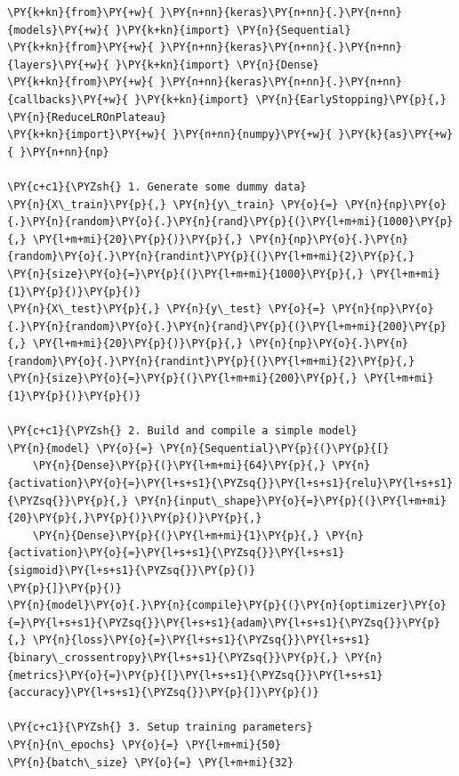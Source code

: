 \begin{Verbatim}[fontsize=\footnotesize, label=\makebox{\url{https://github.com/lucabaldini/cmepda/tree/master/slides/latex/snippets/keras_callbacks_training.py}},commandchars=\\\{\}]
\PY{k+kn}{from}\PY{+w}{ }\PY{n+nn}{keras}\PY{n+nn}{.}\PY{n+nn}{models}\PY{+w}{ }\PY{k+kn}{import} \PY{n}{Sequential}
\PY{k+kn}{from}\PY{+w}{ }\PY{n+nn}{keras}\PY{n+nn}{.}\PY{n+nn}{layers}\PY{+w}{ }\PY{k+kn}{import} \PY{n}{Dense}
\PY{k+kn}{from}\PY{+w}{ }\PY{n+nn}{keras}\PY{n+nn}{.}\PY{n+nn}{callbacks}\PY{+w}{ }\PY{k+kn}{import} \PY{n}{EarlyStopping}\PY{p}{,} \PY{n}{ReduceLROnPlateau}
\PY{k+kn}{import}\PY{+w}{ }\PY{n+nn}{numpy}\PY{+w}{ }\PY{k}{as}\PY{+w}{ }\PY{n+nn}{np}

\PY{c+c1}{\PYZsh{} 1. Generate some dummy data}
\PY{n}{X\_train}\PY{p}{,} \PY{n}{y\_train} \PY{o}{=} \PY{n}{np}\PY{o}{.}\PY{n}{random}\PY{o}{.}\PY{n}{rand}\PY{p}{(}\PY{l+m+mi}{1000}\PY{p}{,} \PY{l+m+mi}{20}\PY{p}{)}\PY{p}{,} \PY{n}{np}\PY{o}{.}\PY{n}{random}\PY{o}{.}\PY{n}{randint}\PY{p}{(}\PY{l+m+mi}{2}\PY{p}{,} \PY{n}{size}\PY{o}{=}\PY{p}{(}\PY{l+m+mi}{1000}\PY{p}{,} \PY{l+m+mi}{1}\PY{p}{)}\PY{p}{)}
\PY{n}{X\_test}\PY{p}{,} \PY{n}{y\_test} \PY{o}{=} \PY{n}{np}\PY{o}{.}\PY{n}{random}\PY{o}{.}\PY{n}{rand}\PY{p}{(}\PY{l+m+mi}{200}\PY{p}{,} \PY{l+m+mi}{20}\PY{p}{)}\PY{p}{,} \PY{n}{np}\PY{o}{.}\PY{n}{random}\PY{o}{.}\PY{n}{randint}\PY{p}{(}\PY{l+m+mi}{2}\PY{p}{,} \PY{n}{size}\PY{o}{=}\PY{p}{(}\PY{l+m+mi}{200}\PY{p}{,} \PY{l+m+mi}{1}\PY{p}{)}\PY{p}{)}

\PY{c+c1}{\PYZsh{} 2. Build and compile a simple model}
\PY{n}{model} \PY{o}{=} \PY{n}{Sequential}\PY{p}{(}\PY{p}{[}
    \PY{n}{Dense}\PY{p}{(}\PY{l+m+mi}{64}\PY{p}{,} \PY{n}{activation}\PY{o}{=}\PY{l+s+s1}{\PYZsq{}}\PY{l+s+s1}{relu}\PY{l+s+s1}{\PYZsq{}}\PY{p}{,} \PY{n}{input\_shape}\PY{o}{=}\PY{p}{(}\PY{l+m+mi}{20}\PY{p}{,}\PY{p}{)}\PY{p}{)}\PY{p}{,}
    \PY{n}{Dense}\PY{p}{(}\PY{l+m+mi}{1}\PY{p}{,} \PY{n}{activation}\PY{o}{=}\PY{l+s+s1}{\PYZsq{}}\PY{l+s+s1}{sigmoid}\PY{l+s+s1}{\PYZsq{}}\PY{p}{)}
\PY{p}{]}\PY{p}{)}
\PY{n}{model}\PY{o}{.}\PY{n}{compile}\PY{p}{(}\PY{n}{optimizer}\PY{o}{=}\PY{l+s+s1}{\PYZsq{}}\PY{l+s+s1}{adam}\PY{l+s+s1}{\PYZsq{}}\PY{p}{,} \PY{n}{loss}\PY{o}{=}\PY{l+s+s1}{\PYZsq{}}\PY{l+s+s1}{binary\_crossentropy}\PY{l+s+s1}{\PYZsq{}}\PY{p}{,} \PY{n}{metrics}\PY{o}{=}\PY{p}{[}\PY{l+s+s1}{\PYZsq{}}\PY{l+s+s1}{accuracy}\PY{l+s+s1}{\PYZsq{}}\PY{p}{]}\PY{p}{)}

\PY{c+c1}{\PYZsh{} 3. Setup training parameters}
\PY{n}{n\_epochs} \PY{o}{=} \PY{l+m+mi}{50}
\PY{n}{batch\_size} \PY{o}{=} \PY{l+m+mi}{32}


\end{Verbatim}
